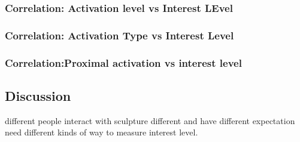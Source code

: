 \subsubsection{Correlation: Activation level vs Interest LEvel}

\subsubsection{Correlation: Activation Type vs Interest Level}
\subsubsection{Correlation:Proximal activation vs interest level}



\subsection{Discussion}

different people interact with sculpture different and have different expectation
need different kinds of way to measure interest level. 



